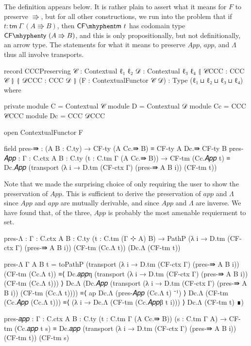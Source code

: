 The definition appears below. It is rather plain to assert what it means for $F$
to preserve $\Rrightarrow$, but for all other constructions, we run into the
problem that if $t : \mathsf{tm}~\Gamma~(A \Rrightarrow B)$, then
$\mathsf{CF\mhyphen tm}~t$ has codomain type $\mathsf{CF\mhyphen ty}~(A
\Rrightarrow B)$, and this is only propositionally, but not definitionally, an
arrow type. The statements for what it means to preserve $\mathit{App}$,
$\mathit{app}$, and $\Lambda$ thus all involve transports.
\begin{code}
record CCCPreserving {𝒞 : Contextual ℓ₁ ℓ₂} {𝒟 : Contextual ℓ₃ ℓ₄}
       ⦃ 𝒞CCC : CCC 𝒞 ⦄ ⦃ 𝒟CCC : CCC 𝒟 ⦄ (F : ContextualFunctor 𝒞 𝒟)
       : Type (ℓ₁ ⊔ ℓ₂ ⊔ ℓ₃ ⊔ ℓ₄) where

  private
    module C = Contextual 𝒞
    module D = Contextual 𝒟
    module Cc = CCC 𝒞CCC
    module Dc = CCC 𝒟CCC

  open ContextualFunctor F

  field
    pres-⇛ : (A B : C.ty) → CF-ty (A Cc.⇛ B) ≡ CF-ty A Dc.⇛ CF-ty B
    pres-𝐴𝑝𝑝 : {Γ : C.ctx} {A B : C.ty} (t : C.tm Γ (A Cc.⇛ B)) →
      CF-tm (Cc.𝐴𝑝𝑝 t)
        ≡ Dc.𝐴𝑝𝑝 (transport (λ i → D.tm (CF-ctx Γ) (pres-⇛ A B i)) (CF-tm t))
\end{code}

Note that we made the surprising choice of only requiring the user to show the
preservation of $\mathit{App}$. This is sufficient to derive the preservation
of $\mathit{app}$ and $\Lambda$ since $\mathit{App}$ and $\mathit{app}$ are
mutually derivable, and since $\mathit{App}$ and $\Lambda$ are inverse.
We have found that, of the three, $\mathit{App}$ is probably the most amenable
requierment to set.
\begin{AgdaMultiCode}
\begin{code}
  pres-Λ : {Γ : C.ctx} {A B : C.ty} (t : C.tm (Γ ⊹ A) B) →
    PathP (λ i → D.tm (CF-ctx Γ) (pres-⇛ A B i)) (CF-tm (Cc.Λ t)) (Dc.Λ (CF-tm t))
\end{code}
\begin{code}[hide]
  pres-Λ {Γ} {A} {B} t =
    toPathP
      (transport (λ i → D.tm (CF-ctx Γ) (pres-⇛ A B i)) (CF-tm (Cc.Λ t))
        ≡⟨ Dc.𝑎𝑝𝑝η (transport (λ i → D.tm (CF-ctx Γ) (pres-⇛ A B i)) (CF-tm (Cc.Λ t))) ⟩
      Dc.Λ (Dc.𝐴𝑝𝑝 (transport (λ i → D.tm (CF-ctx Γ) (pres-⇛ A B i)) (CF-tm (Cc.Λ t))))
        ≡⟨ ap Dc.Λ (pres-𝐴𝑝𝑝 (Cc.Λ t) ⁻¹) ⟩
      Dc.Λ (CF-tm (Cc.𝐴𝑝𝑝 (Cc.Λ t)))
        ≡⟨ (λ i → Dc.Λ (CF-tm (Cc.𝐴𝑝𝑝β t i))) ⟩
      Dc.Λ (CF-tm t)
        ∎)
\end{code}
\begin{code}

  pres-𝑎𝑝𝑝 : {Γ : C.ctx} {A B : C.ty} (t : C.tm Γ (A Cc.⇛ B)) (s : C.tm Γ A) →
    CF-tm (Cc.𝑎𝑝𝑝 t s)
      ≡ Dc.𝑎𝑝𝑝 (transport (λ i → D.tm (CF-ctx Γ) (pres-⇛ A B i)) (CF-tm t)) (CF-tm s)
\end{code}
\end{AgdaMultiCode}

